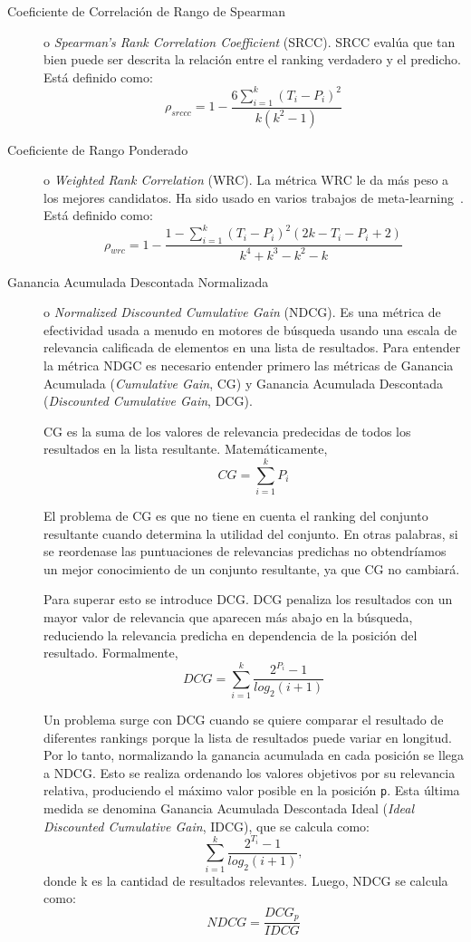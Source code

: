 \begin{description}
	\item[Coeficiente de Correlación de Rango de Spearman]o \textit{Spearman’s Rank Correlation Coefficient} (SRCC). SRCC evalúa que tan  bien puede ser descrita la relación entre el ranking verdadero y el predicho. Está definido como: $$\rho_{srccc} = 1 - \dfrac{6\sum^k_{i=1}(T_i - P_i)^2}{k(k^2-1)}$$
	
	\item[Coeficiente de Rango Ponderado]o \textit{Weighted Rank Correlation} (WRC). La métrica WRC le da más peso a los mejores candidatos. Ha sido usado en varios trabajos de meta-learning~\cite{sun2014MetaLearningAT, soares2004learning, costa2005weighted}. Está definido como: $$\rho_{wrc} = 1 - \dfrac{1-\sum^k_{i=1} (T_i - P_i)^2(2k - T_i - P_i + 2) }{k ^4+k^3-k^2-k}$$
	
	\item[Ganancia Acumulada Descontada Normalizada]o \textit{Normalized Discounted Cumulative Gain} (NDCG). Es una métrica de efectividad usada a menudo en motores de búsqueda usando una escala de relevancia calificada de elementos en una lista de resultados. Para entender la métrica NDGC es necesario entender primero las métricas de Ganancia Acumulada (\textit{Cumulative Gain}, CG) y Ganancia Acumulada Descontada (\textit{Discounted Cumulative Gain}, DCG).
	
	
	CG es la suma de los valores de relevancia predecidas de todos los resultados en la lista resultante. Matemáticamente, $$CG = \sum^k_{i=1}P_i$$
	
	El problema de CG es que no tiene en cuenta el ranking del conjunto resultante cuando determina la utilidad del conjunto. En otras palabras, si se reordenase las puntuaciones de relevancias predichas no obtendríamos un mejor conocimiento de un conjunto resultante, ya que CG no cambiará.
	
	Para superar esto se introduce DCG. DCG penaliza los resultados con un mayor valor de relevancia que aparecen más abajo en la búsqueda, reduciendo la relevancia predicha en dependencia de la posición del resultado. Formalmente, $$DCG = \sum^k_{i=1} \dfrac{2^{P_i} - 1}{log_2(i + 1)}$$
	
	Un problema surge con DCG cuando se quiere comparar el resultado de diferentes rankings porque la lista de resultados puede variar en longitud. Por lo tanto, normalizando la ganancia acumulada en cada posición se llega a NDCG. Esto se realiza ordenando los valores objetivos por su relevancia relativa, produciendo el máximo valor posible en la posición \texttt{p}. Esta última medida se denomina Ganancia Acumulada Descontada Ideal (\textit{Ideal Discounted Cumulative Gain}, IDCG), que se calcula como: $$\sum^k_{i=1} \dfrac{2^{T_i} - 1}{log_2(i+1)}, $$ donde k es la cantidad de resultados relevantes.
	Luego, NDCG se calcula como: $$NDCG = \frac{DCG_p}{IDCG}$$
\end{description}

